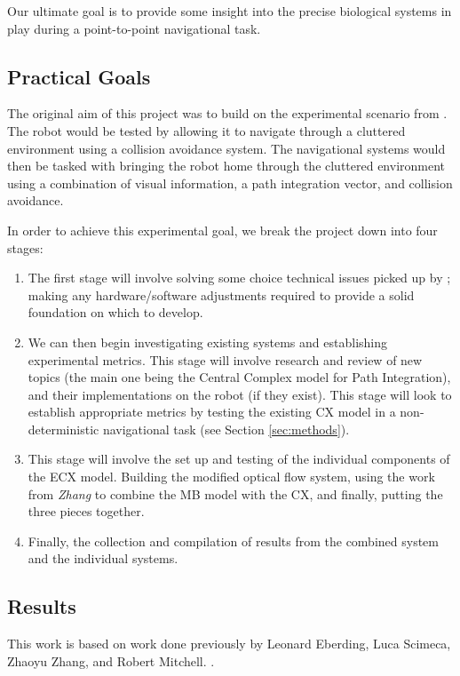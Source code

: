 \documentclass[a4paper,11pt,twoside,openright]{article}
\begin{document}
Our ultimate goal is to provide some insight into the precise biological
systems in play during a point-to-point navigational task.

\subsection { Practical Goals }
The original aim of this project was to build on the experimental
scenario from \cite{Mitchell2018}. The robot would be tested by
allowing it to navigate through a cluttered environment using a
collision avoidance system. The navigational systems would then be
tasked with bringing the robot home through the cluttered environment
using a combination of visual information, a path integration vector,
and collision avoidance.
\newline
\par

In order to achieve this experimental goal, we break the project down
into four stages:

\begin{enumerate}
\item{The first stage will involve solving some choice technical issues
  picked up by \cite{Mitchell2018}; making any hardware/software adjustments
  required to provide a solid foundation on which to develop.}

\item{We can then begin investigating existing systems and establishing
  experimental metrics. This stage will involve research and review of new topics
  (the main one being the Central Complex model for Path Integration), and their
implementations on the robot (if they exist). This stage will look to establish
appropriate metrics by testing the existing CX model in a non-deterministic
navigational task (see Section \ref{sec:methods}).}

\item{This stage will involve the set up and testing of the individual components
  of the ECX model. Building the modified optical flow system, using the work
  from \textit{Zhang} to combine the MB model with the CX, and finally, putting
  the three pieces together.}

\item{Finally, the collection and compilation of results from the combined system
and the individual systems.}
\end{enumerate}

\subsection { Results }
This work is based on work done previously by Leonard Eberding, Luca Scimeca,
Zhaoyu Zhang, and Robert Mitchell.
\cite{Eberding2016, Scimeca2017, Zhang2017, Mitchell2018}.
\newline
\end{document}
